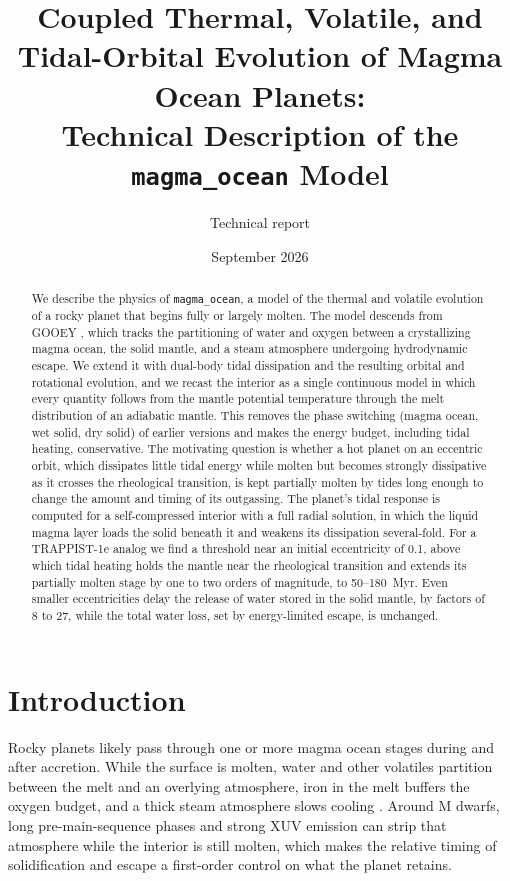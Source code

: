 \documentclass[11pt]{article}
\title{Coupled Thermal, Volatile, and Tidal-Orbital Evolution of Magma Ocean Planets:\\
Technical Description of the \texttt{magma\_ocean} Model}
\author{Technical report}
\date{September 2026}
\begin{document}
\maketitle

\begin{abstract}
We describe the physics of \texttt{magma\_ocean}, a model of the thermal and volatile evolution of a rocky planet that begins fully or largely molten. The model descends from GOOEY \citep{Schaefer2016}, which tracks the partitioning of water and oxygen between a crystallizing magma ocean, the solid mantle, and a steam atmosphere undergoing hydrodynamic escape. We extend it with dual-body tidal dissipation and the resulting orbital and rotational evolution, and we recast the interior as a single continuous model in which every quantity follows from the mantle potential temperature through the melt distribution of an adiabatic mantle. This removes the phase switching (magma ocean, wet solid, dry solid) of earlier versions and makes the energy budget, including tidal heating, conservative. The motivating question is whether a hot planet on an eccentric orbit, which dissipates little tidal energy while molten but becomes strongly dissipative as it crosses the rheological transition, is kept partially molten by tides long enough to change the amount and timing of its outgassing. The planet's tidal response is computed for a self-compressed interior with a full radial solution, in which the liquid magma layer loads the solid beneath it and weakens its dissipation several-fold. For a TRAPPIST-1e analog we find a threshold near an initial eccentricity of 0.1, above which tidal heating holds the mantle near the rheological transition and extends its partially molten stage by one to two orders of magnitude, to 50--180~Myr. Even smaller eccentricities delay the release of water stored in the solid mantle, by factors of 8 to 27, while the total water loss, set by energy-limited escape, is unchanged.
\end{abstract}

\section{Introduction}

Rocky planets likely pass through one or more magma ocean stages during and after accretion. While the surface is molten, water and other volatiles partition between the melt and an overlying atmosphere, iron in the melt buffers the oxygen budget, and a thick steam atmosphere slows cooling \citep{Hamano2013,Lebrun2013,Schaefer2016}. Around M dwarfs, long pre-main-sequence phases and strong XUV emission can strip that atmosphere while the interior is still molten, which makes the relative timing of solidification and escape a first-order control on what the planet retains.
\end{document}
